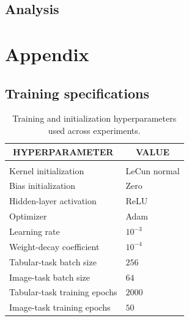 \documentclass[10pt]{article} %
\begin{document}
\subsection{Analysis}




\appendix

\section{Appendix}

\subsection{Training specifications} \label{ap:hyperparams}


\begin{table}[t]
\caption{Training and initialization hyperparameters used across experiments.}
\label{tab:training-hyperparameters}
\begin{center}
\begin{tabular}{ll}
\multicolumn{1}{c}{\bf HYPERPARAMETER}
&
\multicolumn{1}{c}{\bf VALUE}
\\ \hline \\
Kernel initialization          & LeCun normal \\
Bias initialization            & Zero \\
Hidden-layer activation        & ReLU \\
Optimizer                      & Adam \\
Learning rate                  & $10^{-3}$ \\
Weight-decay coefficient       & $10^{-4}$ \\
Tabular-task batch size        & $256$ \\
Image-task batch size          & $64$ \\
Tabular-task training epochs   & $2000$ \\
Image-task training epochs     & $50$ \\
\end{tabular}
\end{center}
\end{table}
\end{document}
